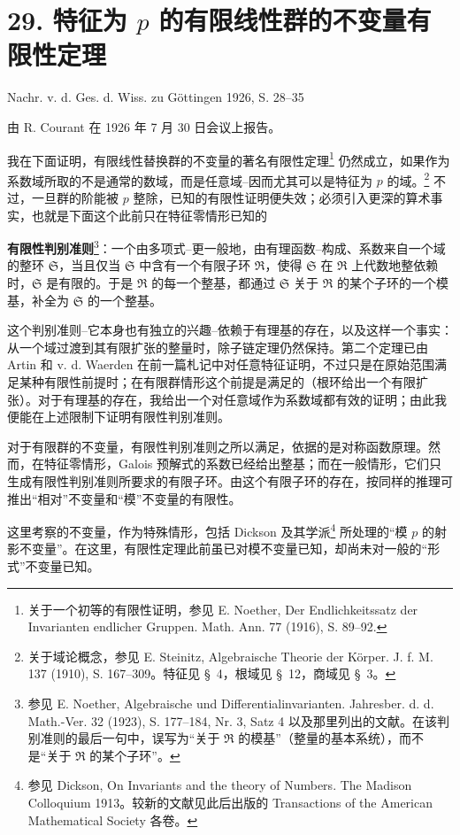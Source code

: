 \section*{29. 特征为 $p$ 的有限线性群的不变量有限性定理}

\begin{center}
Nachr. v. d. Ges. d. Wiss. zu Göttingen 1926, S. 28--35
\end{center}

由 R. Courant 在 1926 年 7 月 30 日会议上报告。

我在下面证明，有限线性替换群的不变量的著名有限性定理\footnote{关于一个初等的有限性证明，参见 E. Noether, Der Endlichkeitssatz der Invarianten endlicher Gruppen. Math. Ann. 77 (1916), S. 89--92.} 仍然成立，如果作为系数域所取的不是通常的数域，而是任意域--因而尤其可以是特征为 $p$ 的域。\footnote{关于域论概念，参见 E. Steinitz, Algebraische Theorie der Körper. J. f. M. 137 (1910), S. 167--309。特征见 \S\ 4，根域见 \S\ 12，商域见 \S\ 3。} 不过，一旦群的阶能被 $p$ 整除，已知的有限性证明便失效；必须引入更深的算术事实，也就是下面这个此前只在特征零情形已知的

\textbf{有限性判别准则}\footnote{参见 E. Noether, Algebraische und Differentialinvarianten. Jahresber. d. d. Math.-Ver. 32 (1923), S. 177--184, Nr. 3, Satz 4 以及那里列出的文献。在该判别准则的最后一句中，误写为“关于 $\mathfrak R$ 的模基”（整量的基本系统），而不是“关于 $\mathfrak R$ 的某个子环”。}：一个由多项式--更一般地，由有理函数--构成、系数来自一个域的整环 $\mathfrak S$，当且仅当 $\mathfrak S$ 中含有一个有限子环 $\mathfrak R$，使得 $\mathfrak S$ 在 $\mathfrak R$ 上代数地整依赖时，$\mathfrak S$ 是有限的。于是 $\mathfrak R$ 的每一个整基，都通过 $\mathfrak S$ 关于 $\mathfrak R$ 的某个子环的一个模基，补全为 $\mathfrak S$ 的一个整基。

这个判别准则--它本身也有独立的兴趣--依赖于有理基的存在，以及这样一个事实：从一个域过渡到其有限扩张的整量时，除子链定理仍然保持。第二个定理已由 Artin 和 v. d. Waerden 在前一篇札记中对任意特征证明，不过只是在原始范围满足某种有限性前提时；在有限群情形这个前提是满足的（根环给出一个有限扩张）。对于有理基的存在，我给出一个对任意域作为系数域都有效的证明；由此我便能在上述限制下证明有限性判别准则。

对于有限群的不变量，有限性判别准则之所以满足，依据的是对称函数原理。然而，在特征零情形，Galois 预解式的系数已经给出整基；而在一般情形，它们只生成有限性判别准则所要求的有限子环。由这个有限子环的存在，按同样的推理可推出“相对”不变量和“模”不变量的有限性。

这里考察的不变量，作为特殊情形，包括 Dickson 及其学派\footnote{参见 Dickson, On Invariants and the theory of Numbers. The Madison Colloquium 1913。较新的文献见此后出版的 Transactions of the American Mathematical Society 各卷。} 所处理的“模 $p$ 的射影不变量”。在这里，有限性定理此前虽已对模不变量已知，却尚未对一般的“形式”不变量已知。

